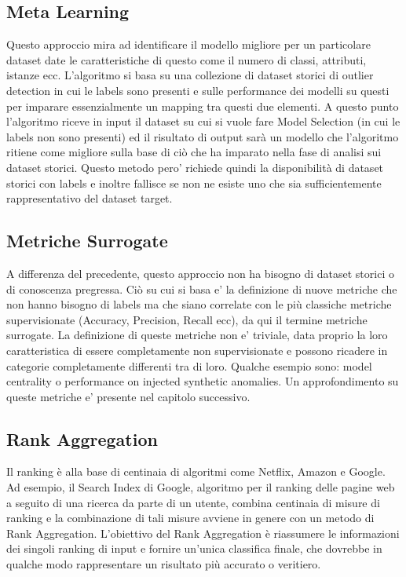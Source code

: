 \subsection{Meta Learning}
Questo approccio mira ad identificare il modello migliore per un particolare dataset date le caratteristiche di questo come il numero di classi, attributi, istanze ecc. L'algoritmo si basa su una collezione di dataset storici di outlier detection in cui le labels sono presenti e sulle performance dei modelli su questi per imparare essenzialmente un mapping tra questi due elementi. 
A questo punto l'algoritmo riceve in input il dataset su cui si vuole fare Model Selection (in cui le labels non sono presenti) ed il risultato di output sarà un modello che l'algoritmo ritiene come migliore sulla base di ciò che ha imparato nella fase di analisi sui dataset storici.
Questo metodo pero' richiede quindi la disponibilità di dataset storici con labels e inoltre fallisce se non ne esiste uno che sia sufficientemente rappresentativo del dataset target.
\subsection{Metriche Surrogate}
A differenza del precedente, questo approccio non ha bisogno di dataset storici o di conoscenza pregressa. Ciò su cui si basa e' la definizione di nuove metriche che non hanno bisogno di labels ma che siano correlate con le più classiche metriche supervisionate (Accuracy, Precision, Recall ecc), da qui il termine metriche surrogate.
La definizione di queste metriche non e' triviale, data proprio la loro caratteristica di essere completamente non supervisionate e possono ricadere in categorie completamente differenti tra di loro. Qualche esempio sono: model centrality o performance on injected synthetic anomalies. Un approfondimento su queste metriche e' presente nel capitolo successivo.


\subsection{Rank Aggregation}
Il ranking è alla base di centinaia di algoritmi come Netflix, Amazon e Google. 
Ad esempio, il Search Index di Google, algoritmo per il ranking delle pagine web a seguito di una ricerca da parte di un utente, combina centinaia di misure di ranking e la combinazione di tali misure avviene in genere con un metodo di Rank Aggregation. 
L'obiettivo del Rank Aggregation è riassumere le informazioni dei singoli ranking di input e fornire un'unica classifica finale, che dovrebbe in qualche modo rappresentare un risultato più accurato o veritiero. 

